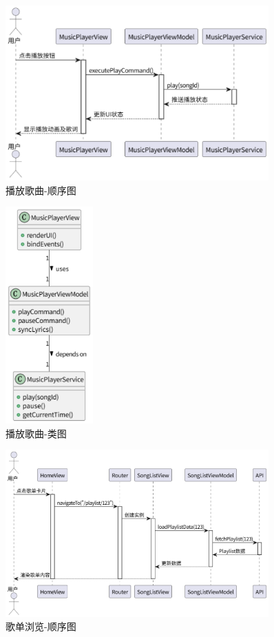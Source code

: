 \documentclass{base}
\numberwithin{figure}{section} %
\begin{document}
\begin{figure}[H]
    \centering
    \includegraphics[width=0.9\textwidth]{images/5-1.png}
    \caption{播放歌曲-顺序图}
\end{figure}
\begin{figure}[H]
    \centering
    \includegraphics[width=0.3\textwidth]{images/5-2.png}
    \caption{播放歌曲-类图}
\end{figure}
\begin{figure}[H]
    \centering
    \includegraphics[width=0.9\textwidth]{images/5-3.png}
    \caption{歌单浏览-顺序图}
\end{figure}
\end{document}
